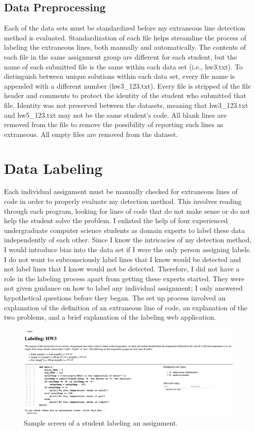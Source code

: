 \subsection{Data Preprocessing}
Each of the data sets must be standardized before my extraneous line detection method is evaluated. Standardization of each file helps streamline the process of labeling the extraneous lines, both manually and automatically. The contents of each file in the same assignment group are different for each student, but the name of each submitted file is the same within each data set (i.e., hw3.txt). To distinguish between unique solutions within each data set, every file name is appended with a different number (hw3\_123.txt). Every file is stripped of the file header and comments to protect the identity of the student who submitted that file. Identity was not preserved between the datasets, meaning that hw3\_123.txt and hw5\_123.txt may not be the same student's code. All blank lines are removed from the file to remove the possibility of reporting such lines as extraneous. All empty files are removed from the dataset.

\section{Data Labeling}

Each individual assignment must be manually checked for extraneous lines of code in order to properly evaluate my detection method. This involves reading through each program, looking for lines of code that do not make sense or do not help the student solve the problem. I enlisted the help of four experienced undergraduate computer science students as domain experts to label these data independently of each other. Since I know the intricacies of my detection method, I would introduce bias into the data set if I were the only person assigning labels. I do not want to subconsciously label lines that I know would be detected and not label lines that I know would not be detected. Therefore, I did not have a role in the labeling process apart from getting these experts started. They were not given guidance on how to label any individual assignment; I only answered hypothetical questions before they began. The set up process involved an explanation of the definition of an extraneous line of code, an explanation of the two problems, and a brief explanation of the labeling web application.

\begin{figure}[ht]
  \includegraphics[width=\textwidth]{figures/webapp.png}
  \caption{Sample screen of a student labeling an assignment.}
  \label{fig:webapp}
\end{figure}


